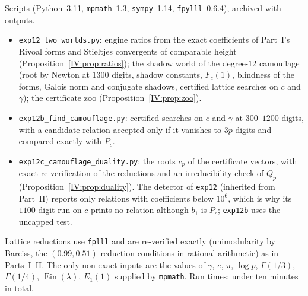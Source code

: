 \documentclass[11pt,a4paper]{article}
\newcommand{\Ein}{\operatorname{Ein}}
\theoremstyle{definition}
\theoremstyle{remark}
\numberwithin{equation}{section}
\begin{document}
Scripts (Python~3.11, \texttt{mpmath}~1.3, \texttt{sympy}~1.14, \texttt{fpylll}~0.6.4),
archived with outputs.
\begin{itemize}[leftmargin=*]
\item \texttt{exp12\_two\_worlds.py}: engine ratios from the exact coefficients of Part~I's
Rivoal forms and Stieltjes convergents of comparable height (Proposition~\ref{IV:prop:ratios});
the shadow world of the degree-$12$ camouflage (root by Newton at $1300$ digits, shadow
constants, $F_c(1)$, blindness of the forms, Galois norm and conjugate shadows, certified
lattice searches on $c$ and $\gamma$); the certificate zoo (Proposition~\ref{IV:prop:zoo}).
\item \texttt{exp12b\_find\_camouflage.py}: certified searches on $c$ and $\gamma$ at
$300$--$1200$ digits, with a candidate relation accepted only if it vanishes to $3p$ digits
and compared exactly with $P_c$.
\item \texttt{exp12c\_camouflage\_duality.py}: the roots $c_p$ of the certificate vectors,
with exact re-verification of the reductions and an irreducibility check of $Q_p$
(Proposition~\ref{IV:prop:duality}). The detector of \texttt{exp12} (inherited from Part~II)
reports only relations with coefficients below $10^6$, which is why its $1100$-digit run on
$c$ prints no relation although $b_1$ is $P_c$; \texttt{exp12b} uses the uncapped test.
\end{itemize}
Lattice reductions use \texttt{fplll} and are re-verified exactly (unimodularity by
Bareiss, the $(0.99,0.51)$ reduction conditions in rational arithmetic) as in Parts~I--II.
The only non-exact inputs are the values of $\gamma$, $e$, $\pi$, $\log p$, $\Gamma(1/3)$,
$\Gamma(1/4)$, $\Ein(\lambda)$, $E_1(1)$ supplied by \texttt{mpmath}. Run times: under ten
minutes in total.
\end{document}
